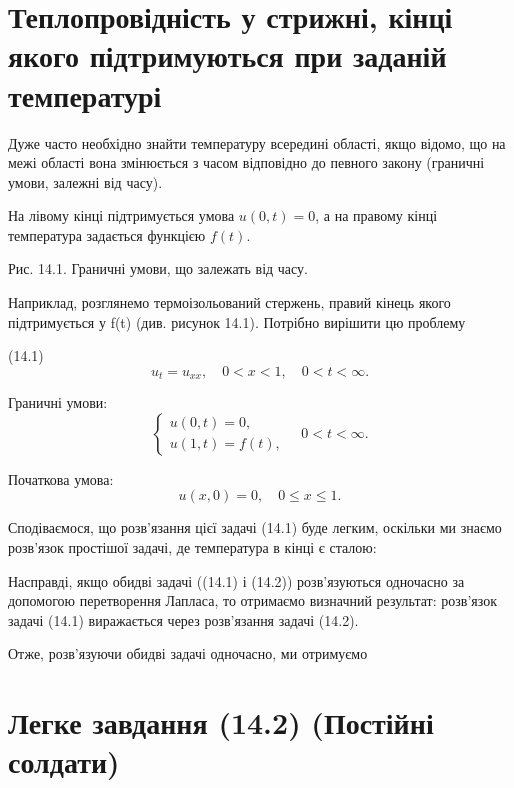 \documentclass[
  ukrainian,
]{article}
\begin{document}
\section{Теплопровідність у стрижні, кінці якого підтримуються при
заданій
температурі}\label{ux442ux435ux43fux43bux43eux43fux440ux43eux432ux456ux434ux43dux456ux441ux442ux44c-ux443-ux441ux442ux440ux438ux436ux43dux456-ux43aux456ux43dux446ux456-ux44fux43aux43eux433ux43e-ux43fux456ux434ux442ux440ux438ux43cux443ux44eux442ux44cux441ux44f-ux43fux440ux438-ux437ux430ux434ux430ux43dux456ux439-ux442ux435ux43cux43fux435ux440ux430ux442ux443ux440ux456}

Дуже часто необхідно знайти температуру всередині області, якщо відомо,
що на межі області вона змінюється з часом відповідно до певного закону
(граничні умови, залежні від часу).

На лівому кінці підтримується умова \(u(0,t)=0\), а на правому кінці
температура задається функцією \(f(t)\).

Рис. 14.1. Граничні умови, що залежать від часу.

Наприклад, розглянемо термоізольований стержень, правий кінець якого
підтримується у f(t) (див. рисунок 14.1). Потрібно вирішити цю проблему

(14.1) \[
u_t = u_{xx}, \quad 0 < x < 1, \quad 0 < t < \infty.
\]

Граничні умови: \[
\begin{cases}
u(0, t) = 0, \\
u(1, t) = f(t),
\end{cases}
\quad 0 < t < \infty.
\]

Початкова умова: \[
u(x, 0) = 0, \quad 0 \le x \le 1.
\]

Сподіваємося, що розв'язання цієї задачі (14.1) буде легким, оскільки ми
знаємо розв'язок простішої задачі, де температура в кінці є сталою:

Насправді, якщо обидві задачі ((14.1) і (14.2)) розв'язуються одночасно
за допомогою перетворення Лапласа, то отримаємо визначний результат:
розв'язок задачі (14.1) виражається через розв'язання задачі (14.2).

Отже, розв'язуючи обидві задачі одночасно, ми отримуємо

\section{Легке завдання (14.2) (Постійні
солдати)}\label{ux43bux435ux433ux43aux435-ux437ux430ux432ux434ux430ux43dux43dux44f-14.2-ux43fux43eux441ux442ux456ux439ux43dux456-ux441ux43eux43bux434ux430ux442ux438}
\end{document}
